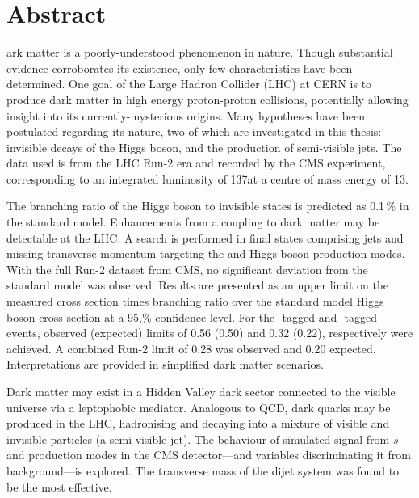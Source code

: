 %
%
%

\chapter*{Abstract}
\begin{SingleSpace}
ark matter is a poorly-understood phenomenon in nature. Though substantial evidence corroborates its existence, only few characteristics have been determined. One goal of the Large Hadron Collider (LHC) at CERN is to produce dark matter in high energy proton-proton collisions, potentially allowing insight into its currently-mysterious origins. Many hypotheses have been postulated regarding its nature, two of which are investigated in this thesis: invisible decays of the Higgs boson, and the production of semi-visible jets. The data used is from the LHC Run-2 era and recorded by the CMS experiment, corresponding to an integrated luminosity of 137\fbinv at a centre of mass energy of 13\TeV.

The branching ratio of the Higgs boson to invisible states is predicted as 0.1\,\% in the standard model. Enhancements from a coupling to dark matter may be detectable at the LHC. A search is performed in final states comprising jets and missing transverse momentum targeting the \ttH and \VH Higgs boson production modes. With the full Run-2 dataset from CMS, no significant deviation from the standard model was observed. Results are presented as an upper limit on the measured cross section times branching ratio over the standard model Higgs boson cross section at a 95,\% confidence level. For the \ttH-tagged and \VH-tagged events, observed (expected) limits of 0.56 (0.50) and 0.32 (0.22), respectively were achieved. A combined Run-2 limit of 0.28 was observed and 0.20 expected. Interpretations are provided in simplified dark matter scenarios.

Dark matter may exist in a Hidden Valley dark sector connected to the visible universe via a leptophobic mediator. Analogous to QCD, dark quarks may be produced in the LHC, hadronising and decaying into a mixture of visible and invisible particles (a semi-visible jet). The behaviour of simulated signal from $s$- and \tchannel production modes in the CMS detector---and variables discriminating it from background---is explored. The transverse mass of the dijet system was found to be the most effective.
\end{SingleSpace}
\clearpage
